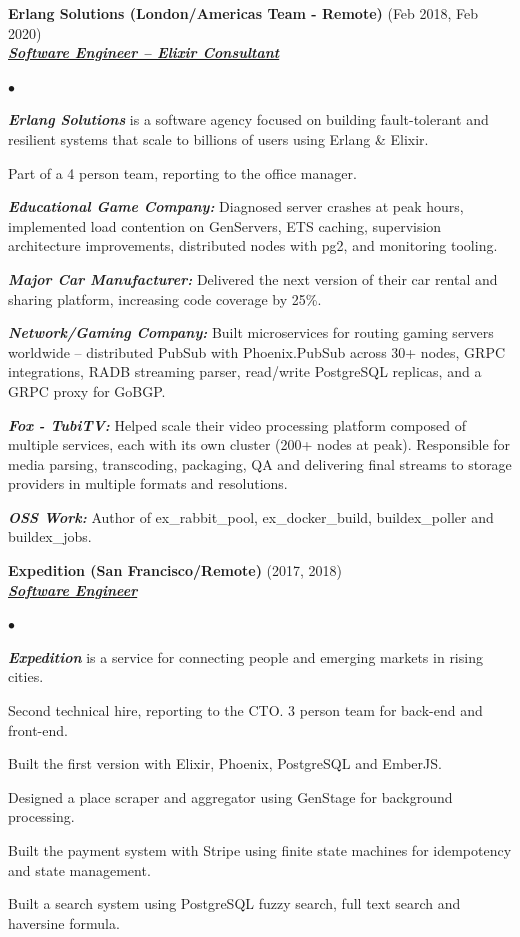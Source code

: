 \documentclass[a4paper]{article}
\newcommand{\employer}[3]{{
  \textbf{#1} (#2)\\ \underline{\textbf{\emph{#3}}}\\ }}
\newenvironment{achievements}{\begin{list}{$\bullet$}{\topsep 0pt \itemsep
  -2pt}}{\vspace*{4pt}\end{list}}
\newcommand{\emphasys}[1]{\textbf{\emph{#1}}}
\begin{document}
  \employer{ Erlang Solutions (London/Americas Team - Remote)}{Feb 2018, Feb 2020}{Software Engineer -- Elixir Consultant}
  \begin{achievements}
  \item \emphasys{Erlang Solutions} is a software agency focused on building fault-tolerant and resilient systems that scale to billions of users using Erlang \& Elixir.
  \item Part of a 4 person team, reporting to the office manager.
  \item \emphasys{Educational Game Company:} Diagnosed server crashes at peak hours, implemented load contention on GenServers, ETS caching, supervision architecture improvements, distributed nodes with pg2, and monitoring tooling.
  \item \emphasys{Major Car Manufacturer:} Delivered the next version of their car rental and sharing platform, increasing code coverage by 25\%.
  \item \emphasys{Network/Gaming Company:} Built microservices for routing gaming servers worldwide -- distributed PubSub with Phoenix.PubSub across 30+ nodes, GRPC integrations, RADB streaming parser, read/write PostgreSQL replicas, and a GRPC proxy for GoBGP.
  \item \emphasys{Fox - TubiTV:} Helped scale their video processing platform composed of multiple services, each with its own cluster (200+ nodes at peak). Responsible for media parsing, transcoding, packaging, QA and delivering final streams to storage providers in multiple formats and resolutions.
  \item \emphasys{OSS Work:} Author of ex\_rabbit\_pool, ex\_docker\_build, buildex\_poller and buildex\_jobs.
  \end{achievements}

  \employer{ Expedition (San Francisco/Remote)}{2017, 2018}{Software Engineer}
  \begin{achievements}
  \item \emphasys{Expedition} is a service for connecting people and emerging markets in rising cities.
  \item Second technical hire, reporting to the CTO. 3 person team for back-end and front-end.
  \item Built the first version with Elixir, Phoenix, PostgreSQL and EmberJS.
  \item Designed a place scraper and aggregator using GenStage for background processing.
  \item Built the payment system with Stripe using finite state machines for idempotency and state management.
  \item Built a search system using PostgreSQL fuzzy search, full text search and haversine formula.
  \end{achievements}
\end{document}
